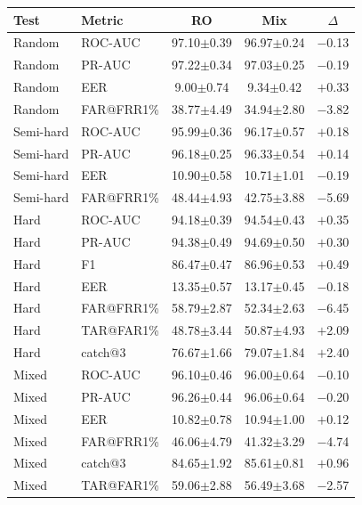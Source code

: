 \documentclass[11pt]{article}
\begin{document}
\begin{table}[!t]
\begin{minipage}[t]{0.48\textwidth}
\begin{tabular}{l l c c c}
\toprule
\textbf{Test} & \textbf{Metric} & \textbf{RO} & \textbf{Mix} & \textbf{$\Delta$} \\
\midrule
Random    & ROC-AUC    & 97.10$\pm$0.39 & 96.97$\pm$0.24 & $-$0.13 \\
Random    & PR-AUC     & 97.22$\pm$0.34 & 97.03$\pm$0.25 & $-$0.19 \\
Random    & EER        & \phantom{0}9.00$\pm$0.74 & \phantom{0}9.34$\pm$0.42 & $+$0.33 \\
Random    & FAR@FRR1\% & 38.77$\pm$4.49 & 34.94$\pm$2.80 & $-$3.82 \\
\midrule
Semi-hard & ROC-AUC    & 95.99$\pm$0.36 & 96.17$\pm$0.57 & $+$0.18 \\
Semi-hard & PR-AUC     & 96.18$\pm$0.25 & 96.33$\pm$0.54 & $+$0.14 \\
Semi-hard & EER        & 10.90$\pm$0.58 & 10.71$\pm$1.01 & $-$0.19 \\
Semi-hard & FAR@FRR1\% & 48.44$\pm$4.93 & 42.75$\pm$3.88 & $-$5.69 \\
\midrule
Hard      & ROC-AUC    & 94.18$\pm$0.39 & 94.54$\pm$0.43 & $+$0.35 \\
Hard      & PR-AUC     & 94.38$\pm$0.49 & 94.69$\pm$0.50 & $+$0.30 \\
Hard      & F1         & 86.47$\pm$0.47 & 86.96$\pm$0.53 & $+$0.49 \\
Hard      & EER        & 13.35$\pm$0.57 & 13.17$\pm$0.45 & $-$0.18 \\
Hard      & FAR@FRR1\% & 58.79$\pm$2.87 & 52.34$\pm$2.63 & $-$6.45 \\
Hard      & TAR@FAR1\% & 48.78$\pm$3.44 & 50.87$\pm$4.93 & $+$2.09 \\
Hard      & catch@3    & 76.67$\pm$1.66 & 79.07$\pm$1.84 & $+$2.40 \\
\midrule
Mixed     & ROC-AUC    & 96.10$\pm$0.46 & 96.00$\pm$0.64 & $-$0.10 \\
Mixed     & PR-AUC     & 96.26$\pm$0.44 & 96.06$\pm$0.64 & $-$0.20 \\
Mixed     & EER        & 10.82$\pm$0.78 & 10.94$\pm$1.00 & $+$0.12 \\
Mixed     & FAR@FRR1\% & 46.06$\pm$4.79 & 41.32$\pm$3.29 & $-$4.74 \\
Mixed     & catch@3    & 84.65$\pm$1.92 & 85.61$\pm$0.81 & $+$0.96 \\
Mixed     & TAR@FAR1\% & 59.06$\pm$2.88 & 56.49$\pm$3.68 & $-$2.57 \\
\bottomrule
\end{tabular}
\label{tab:app_pan_bert}
\end{minipage}


\end{table}
\end{document}
